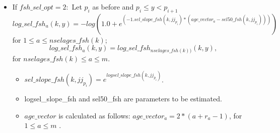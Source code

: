 \documentclass{article}
\begin{document}
\begin{itemize}
    
\item If $fsh\_sel\_opt=2:$ 
Let $p_i$ as before and  $p_i\leq y < p_{i+1}$
\begin{equation}
            log\_sel\_fsh_a(k,y)=-log( 1.0 + e^{(-1.sel\_slope\_fsh(k,jj_{p_i}) * ( age\_vector_a - sel50\_fsh(k,jj_{p_i})) )})
        \end{equation}
        for $1\leq a \leq nselages\_fsh(k)$;
        \begin{equation}
            log\_sel\_fsh_a(k,y)=log\_sel\_fsh_{nselages\_fsh(k))}(k,y),
        \end{equation}
        for $nselages\_fsh(k) \leq a \leq m$.
        \begin{itemize}
            \item $sel\_slope\_fsh(k,jj_{p_i}) = e^{logsel\_slope\_fsh(k,jj_{p_i})}$.
            \item logsel\_slope\_fsh and sel50\_fsh are parameters to be estimated.
            \item $age\_vector$ is calculated as follows: $age\_vector_a=2*(a+r_a-1)$, for $1\leq a \leq m$
            .
        \end{itemize}



\end{itemize}
\end{document}
